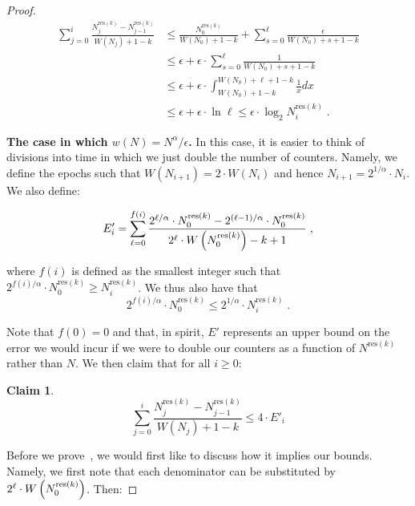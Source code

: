 \documentclass[sigconf]{acmart}
\newtheorem{claim}[theorem]{Claim}
\begin{document}
\begin{proof}
\begin{align*}
	\sum_{j=0}^i  \frac{N^{\text{res}(k)}_j- N^{\text{res}(k)}_{j-1}}{W(N_j)+1-k} &\leq \frac{N^{\text{res}(k)}_0} {W(N_0)+1-k} + \sum_{s=0}^{\ell}  \frac{\epsilon}{W(N_0)+s+1-k} \\
	&\leq \epsilon + \epsilon \cdot \sum_{s=0}^{\ell}  \frac{1}{W(N_0)+s+1-k} \\
	&\leq \epsilon + \epsilon \cdot \int_{W(N_0)+1-k}^{W(N_0)+\ell+1-k}  \frac{1}{x} dx \\
	&\leq \epsilon + \epsilon \cdot \ln \ell \leq \epsilon \cdot \log_2 N^{\text{res}(k)}_i \;.
\end{align*}

\medskip\noindent
\textbf{The case in which $w(N)=N^{\alpha}/\epsilon$.}   In this case, it is easier to think of divisions into time in which we just double the number of counters. Namely, we define the epochs such that $W(N_{i+1}) = 2\cdot W(N_i)$ and hence $N_{i+1} = 2^{1/\alpha} \cdot N_i$. We also define:

$$ E'_i = \sum_{\ell=0}^{f(i)} \frac{2^{\ell/\alpha} \cdot N^{\text{res}(k)}_0 - 2^{(\ell-1)/\alpha} \cdot N^{\text{res}(k)}_0}{2^{\ell} \cdot W\left(N^{\text{res}(k)}_0 \right)-k+1}\;,$$

where $f(i)$ is defined as the smallest integer such that $2^{f(i)/\alpha}\cdot N^{\text{res}(k)}_0 \geq N^{\text{res}(k)}_i$. We thus also have that 
$$2^{f(i)/\alpha}\cdot N^{\text{res}(k)}_0 \leq 2^{1/\alpha} \cdot N^{\text{res}(k)}_i\;.$$

Note that $f(0)=0$ and that, in spirit, $E'$ represents an upper bound on the error we would incur if we were to double our counters as a function of $N^{\text{res}(k)}$ rather than $N$. We then claim that for all $i\geq 0$:

\begin{claim}\label{claim:ms-major}	$$ \sum_{j=0}^i  \frac{N^{\text{res}(k)}_j- N^{\text{res}(k)}_{j-1}}{W(N_j)+1-k} \leq 4\cdot E'_i$$
\end{claim}	

Before we prove~, we would first like to discuss how it implies our bounds. Namely, we first note that each denominator can be substituted by $2^{\ell} \cdot W\left(N^{\text{res}(k)}_0\right)$. Then:


\end{proof}
\end{document}
